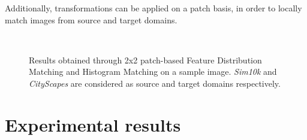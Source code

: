\documentclass[%
    corpo=12pt,
    twoside,
    stile=classica,   
    tipotesi=magistrale,
    evenboxes,
    english,
	numerazioneromana,
]{toptesi}
\begin{document}
Additionally, transformations can be applied on a patch basis, in order to locally match images from source and target domains.

\begin{figure}[ht]
	\centering
	\\
	\caption{Results obtained through 2x2 patch-based Feature Distribution Matching and Histogram Matching on a sample image. \textit{Sim10k} and \textit{CityScapes} are considered as source and target domains respectively.}
	\label{fig:patchkis}
\end{figure}

\chapter{Experimental results}
\end{document}
